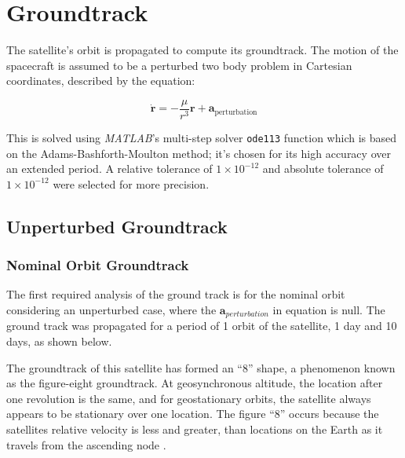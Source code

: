 \section{Groundtrack}
\label{sec:groundtrack}

The satellite's orbit is propagated to compute its groundtrack. The motion of the spacecraft is assumed to be a perturbed two body problem in Cartesian coordinates, described by the equation:

\begin{equation}
	\dot{\mathbf{r}} = -\frac{\mu}{r^3} \mathbf{r} + \mathbf{a}_{\text{perturbation}}
\end{equation}

This is solved using \textit{MATLAB}'s multi-step solver \texttt{ode113} function which is based on the Adams-Bashforth-Moulton method; it's chosen for its high accuracy over an extended period. A relative tolerance of \(1 \times 10^{-12}\) and absolute tolerance of \(1 \times 10^{-12}\) were selected for more precision.


\subsection{Unperturbed Groundtrack}

\subsubsection{Nominal Orbit Groundtrack}

The first required analysis of the ground track is for the nominal orbit considering an unperturbed case, where the $\mathbf{a}_{perturbation}$ in equation is null. The ground track was propagated for a period of 1 orbit of the satellite, 1 day and 10 days, as shown below.


The groundtrack of this satellite has formed an “8” shape, a phenomenon known as the figure-eight groundtrack. At geosynchronous altitude, the location after one revolution is the same, and for geostationary  orbits, the satellite always appears to be stationary over one location. The figure “8” occurs because the satellites relative velocity is less and greater, than locations on the Earth as it travels from the ascending node \cite{vallado}.


